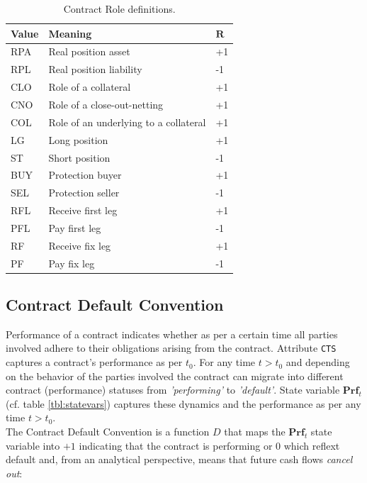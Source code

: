 \documentclass[9pt,oneside]{amsart}
\newcommand{\svar}[2]{\textbf{#1}_{#2}}
\newcommand{\attr}[1]{\texttt{#1}}
\begin{document}
\begin{multicols}{2}
\begin{table}[H]
	\centering
	\begin{tabular}{| p{0.5in}p{1.5in}p{0.2in} |}
	\hline
	\textbf{Value} & \textbf{Meaning} & $\textbf{R}$ \\
	\hline
	RPA & Real position asset & +1 \\
	\hline
	RPL & Real position liability & -1 \\
	\hline
	CLO & Role of a collateral & +1 \\
	\hline
	CNO & Role of a close-out-netting & +1 \\
	\hline
	COL & Role of an underlying to a collateral & +1 \\
	\hline
	LG & Long position & +1 \\
	\hline
	ST & Short position & -1 \\
	\hline
	BUY & Protection buyer & +1 \\
	\hline
	SEL & Protection seller & -1 \\
	\hline
	RFL & Receive first leg & +1 \\
	\hline
	PFL & Pay first leg & -1 \\
	\hline
	RF & Receive fix leg & +1 \\
	\hline
	PF & Pay fix leg & -1 \\
	\hline
	\end{tabular}
	\caption{Contract Role definitions.}
	\label{tbl:cntrl}
\end{table}


\subsection{Contract Default Convention}\label{sec:default}

Performance of a contract indicates whether as per a certain time all parties involved adhere to their obligations arising from the contract. Attribute \attr{CTS} captures a contract's performance as per $t_0$. For any time $t>t_0$ and depending on the behavior of the parties involved the contract can migrate into different contract (performance) statuses from \textit{'performing'} to \textit{'default'}. State variable $\svar{Prf}{t}$ (cf. table \ref{tbl:statevars}) captures these dynamics and the performance as per any time $t>t_0$.\\

The Contract Default Convention is a function $D$ that maps the $\svar{Prf}{t}$ state variable into $+1$ indicating that the contract is performing or $0$ which reflext default and, from an analytical perspective, means that future cash flows \textit{cancel out}:


\end{multicols}
\end{document}
